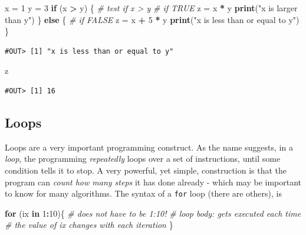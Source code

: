 \documentclass[]{book}
\newenvironment{Shaded}{\begin{snugshade}}{\end{snugshade}}
\newcommand{\CommentTok}[1]{\textcolor[rgb]{0.56,0.35,0.01}{\textit{#1}}}
\newcommand{\ControlFlowTok}[1]{\textcolor[rgb]{0.13,0.29,0.53}{\textbf{#1}}}
\newcommand{\DecValTok}[1]{\textcolor[rgb]{0.00,0.00,0.81}{#1}}
\newcommand{\KeywordTok}[1]{\textcolor[rgb]{0.13,0.29,0.53}{\textbf{#1}}}
\newcommand{\NormalTok}[1]{#1}
\newcommand{\OperatorTok}[1]{\textcolor[rgb]{0.81,0.36,0.00}{\textbf{#1}}}
\newcommand{\StringTok}[1]{\textcolor[rgb]{0.31,0.60,0.02}{#1}}
\begin{document}
\begin{Shaded}
\begin{Highlighting}[]
\NormalTok{x =}\StringTok{ }\DecValTok{1}
\NormalTok{y =}\StringTok{ }\DecValTok{3}
\ControlFlowTok{if}\NormalTok{ (x }\OperatorTok{>}\StringTok{ }\NormalTok{y) \{  }\CommentTok{# test if x > y}
  \CommentTok{# if TRUE}
\NormalTok{  z =}\StringTok{ }\NormalTok{x }\OperatorTok{*}\StringTok{ }\NormalTok{y}
  \KeywordTok{print}\NormalTok{(}\StringTok{"x is larger than y"}\NormalTok{)}
\NormalTok{\} }\ControlFlowTok{else}\NormalTok{ \{}
  \CommentTok{# if FALSE}
\NormalTok{  z =}\StringTok{ }\NormalTok{x }\OperatorTok{+}\StringTok{ }\DecValTok{5} \OperatorTok{*}\StringTok{ }\NormalTok{y}
  \KeywordTok{print}\NormalTok{(}\StringTok{"x is less than or equal to y"}\NormalTok{)}
\NormalTok{\}}
\end{Highlighting}
\end{Shaded}

\begin{verbatim}
#OUT> [1] "x is less than or equal to y"
\end{verbatim}

\begin{Shaded}
\begin{Highlighting}[]
\NormalTok{z}
\end{Highlighting}
\end{Shaded}

\begin{verbatim}
#OUT> [1] 16
\end{verbatim}

\hypertarget{loops}{%
\subsection{Loops}\label{loops}}

Loops are a very important programming construct. As the name suggests, in a \emph{loop}, the programming \emph{repeatedly} loops over a set of instructions, until some condition tells it to stop. A very powerful, yet simple, construction is that the program can \emph{count how many steps} it has done already - which may be important to know for many algorithms. The syntax of a \texttt{for} loop (there are others), is

\begin{Shaded}
\begin{Highlighting}[]
\ControlFlowTok{for}\NormalTok{ (ix }\ControlFlowTok{in} \DecValTok{1}\OperatorTok{:}\DecValTok{10}\NormalTok{)\{   }\CommentTok{# does not have to be 1:10!}
  \CommentTok{# loop body: gets executed each time}
  \CommentTok{# the value of ix changes with each iteration}
\NormalTok{\}}
\end{Highlighting}
\end{Shaded}
\end{document}
